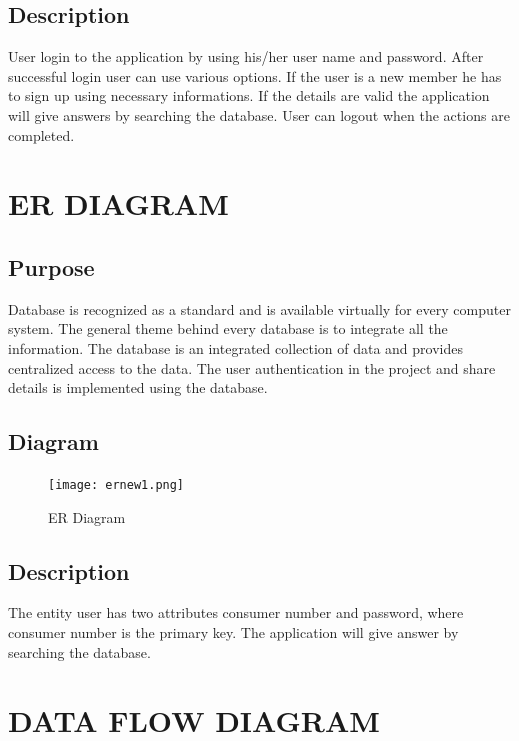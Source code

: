 \documentclass[12pt,a4paper,oneside]{report}
\begin{document}
\subsection{Description}
\par User login to the application by using his/her user name and password. After successful login user can use various options. If the user is a new member he has to sign up using necessary informations. If the details are valid the application will give answers by searching the database. User can  logout when the actions are completed.\\ 
\newpage
\section{ER DIAGRAM}
\subsection{Purpose}
Database is recognized as a standard and is available virtually for every computer system.
The general theme behind every database is to integrate all the information. The database is an
integrated collection of data and provides centralized access to the data. The user authentication
in the project and share details is implemented using the database.
\subsection{Diagram}
\begin{figure}[h]
  	\begin{center}
  		\texttt{[image: ernew1.png]}
  			\caption{ER Diagram}
  			\label{ER Diagram}
  	\end{center}
  \end{figure}
  \newpage
\subsection{Description}
 The entity user has two attributes consumer number and password, where consumer number is the primary key. The application will give answer by searching the database.
\section{DATA FLOW DIAGRAM}
\end{document}
